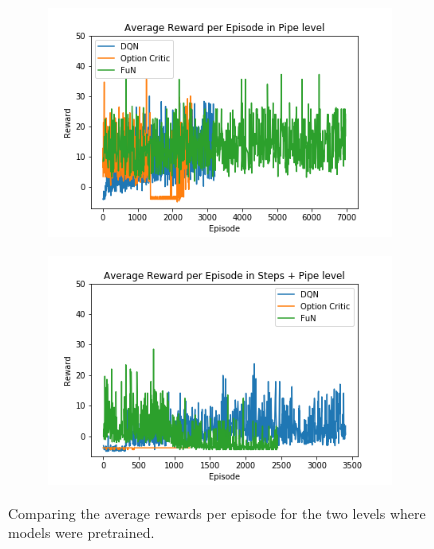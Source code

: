 \documentclass[notitlepage,a4paper,11pt]{article}
\begin{document}
\begin{figure}[htb!]
     \centering
     \begin{subfigure}[t]{0.48\textwidth}
         \centering
         \includegraphics[width=\textwidth]{figs/all_results_1.png}
         \caption{}
         \label{fig:all_results_1}
     \end{subfigure}
     \hfill
     \begin{subfigure}[t]{0.48\textwidth}
         \centering
         \includegraphics[width=\textwidth]{figs/all_results_2.png}
         \caption{}
         \label{fig:fun_results_2}
     \end{subfigure}
     \hfill
        \caption{Comparing the average rewards per episode for the two levels where models were pretrained.}
        \label{fig:all_results}
       
\end{figure}
\end{document}
